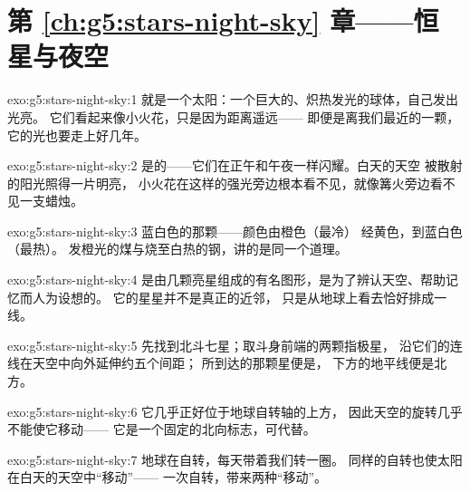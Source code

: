 \section*{第 \ref{ch:g5:stars-night-sky} 章——恒星与夜空}

\begin{solution}{exo:g5:stars-night-sky:1}
就是一个太阳：一个巨大的、炽热发光的球体，自己发出光亮。
它们看起来像小火花，只是因为距离遥远——
即便是离我们最近的一颗，它的光也要走上好几年。
\end{solution}

\begin{solution}{exo:g5:stars-night-sky:2}
是的——它们在正午和午夜一样闪耀。白天的天空
被散射的阳光照得一片明亮，
小火花在这样的强光旁边根本看不见，就像篝火旁边看不见一支蜡烛。
\end{solution}

\begin{solution}{exo:g5:stars-night-sky:3}
蓝白色的那颗——颜色由橙色（最冷）
经黄色，到蓝白色（最热）。
发橙光的煤与烧至白热的钢，讲的是同一个道理。
\end{solution}

\begin{solution}{exo:g5:stars-night-sky:4}
是由几颗亮星组成的有名图形，是为了辨认天空、帮助记忆而人为设想的。
它的星星并不是真正的近邻，
只是从地球上看去恰好排成一线。
\end{solution}

\begin{solution}{exo:g5:stars-night-sky:5}
先找到北斗七星；取斗身前端的两颗指极星，
沿它们的连线在天空中向外延伸约五个间距；
所到达的那颗星便是，
下方的地平线便是北方。
\end{solution}

\begin{solution}{exo:g5:stars-night-sky:6}
它几乎正好位于地球自转轴的上方，
因此天空的旋转几乎不能使它移动——
它是一个固定的北向标志，可代替。
\end{solution}

\begin{solution}{exo:g5:stars-night-sky:7}
地球在自转，每天带着我们转一圈。
同样的自转也使太阳在白天的天空中“移动”——
一次自转，带来两种“移动”。
\end{solution}

